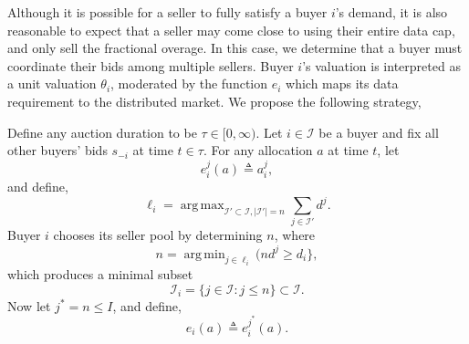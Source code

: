 \documentclass[12pt]{article}
\theoremstyle{definition}
\newcommand{\vs}{\varsigma}
\newcommand{\mcI}{\mathcal{I}}
\DeclareMathOperator*{\argmax}{arg\,max}
\DeclareMathOperator*{\argmin}{arg\,min}
\begin{document}
\begin{multicols}{2}
Although it is possible for a seller to fully satisfy a buyer $i$'s demand, it
is also reasonable to expect that a seller may come close to using their
entire data cap, and only sell the fractional overage. In this case, we
determine that a buyer must coordinate their bids among multiple sellers. 
Buyer $i$'s valuation is interpreted as a unit valuation $\theta_i$,
moderated by the function $e_i$ which maps its data requirement to the distributed market. 
We propose the following strategy, 
{
\label{buyerstrategy}
Define any auction duration to be $\tau \in [0,\infty)$. 
Let $i\in\mcI$ be a buyer and fix all other buyers' bids $s_{-i}$ at time
$t\in\tau$. For any allocation $a$ at time $t$, let
\begin{equation}\label{opt-out}
    e_i^j(a) \triangleq a_i^j,
\end{equation}
and define,
$$
    \ell_i =\argmax_{\mcI' \subset \mcI, \vert\mcI'\vert =
n}\sum_{j\in\mcI'} d^j.
$$
Buyer $i$ chooses its seller pool by determining $n$, where
\begin{equation}\label{buyercoordinate}
    n = \argmin_{j\in \ell_i}(n d^j\ge d_i\rbrace,
\end{equation} 
which produces a minimal subset 
\begin{equation}\label{sellers}
    \mcI_i = \lbrace j \in \mcI : j \le n\rbrace \subset \mcI.
\end{equation} 
Now let $j^* = n \le I$, and define, 
\begin{equation}\label{opt-minallocation}
    e_i(a) \triangleq e_i^{j^*}(a).
\end{equation}

}
\end{multicols}
\end{document}
